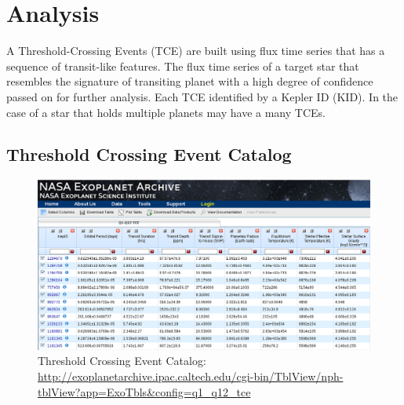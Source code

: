 \chapter{Analysis}





	

A Threshold-Crossing Events (TCE) are built using flux time series that has a sequence of transit-like features. The flux time series of a target star that resembles the signature of transiting planet with a high degree of confidence passed on for further analysis. Each TCE identified by a Kepler ID (KID). In the case of a star that holds multiple planets may have a many TCEs. 

\section{Threshold Crossing Event Catalog}

\begin{figure}[!h]
\begin{center}
        \includegraphics[width=0.8\textheight]{img/TCECatalog.png}
        \caption{Threshold Crossing Event Catalog:  \url{http://exoplanetarchive.ipac.caltech.edu/cgi-bin/TblView/nph-tblView?app=ExoTbls&config=q1_q12_tce}}  \label{fig:tcecatalog}
\end{center}
\end{figure}

